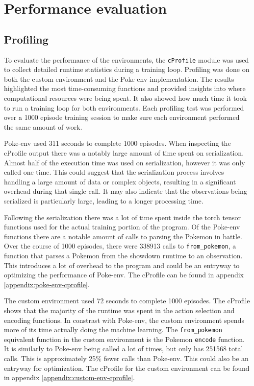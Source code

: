 \section{Performance evaluation}
\label{sec:performance-evaluation}

\subsection{Profiling}
\label{sec:profiling}
To evaluate the performance of the environments, the \lstinline|cProfile| module was used to collect detailed runtime statistics during a training loop. 
Profiling was done on both the custom environment and the Poke-env implementation. The results highlighted the most time-consuming functions and provided 
insights into where computational resources were being spent. It also showed how much time it took to run a training loop for both environments.
Each profiling test was performed over a 1000 episode training session to make sure each environment performed the same amount of work.

Poke-env used 311 seconds to complete 1000 episodes. When inspecting the cProfile output there was a notably large amount of time spent on serialization.
Almost half of the execution time was used on serialization, however it was only called one time. This could suggest that the serialization process involves 
handling a large amount of data or complex objects, resulting in a significant overhead during that single call. It may also indicate that the 
observations being serialized is particularly large, leading to a longer processing time. 

Following the serialization there was a lot of time spent inside the torch tensor functions used for the actual training portion of the program. Of the Poke-env
functions there are a notable amount of calls to parsing the Pokemon in battle. Over the course of 1000 episodes, there were 338913 calls to \lstinline|from_pokemon|, 
a function that parses a Pokemon from the showdown runtime to an observation. This introduces a lot of overhead to the program and could be an entryway
to optimizing the performance of Poke-env. The cProfile can be found in appendix \ref{appendix:poke-env-cprofile}.

The custom environment used 72 seconds to complete 1000 episodes. The cProfile shows that the majority of the runtime was spent in the 
action selection and encoding functions. In constrast with Poke-env, the custom environment spends more of its time actually doing the machine learning.
The \lstinline|from_pokemon| equivalent function in the custom environment is the Pokemon \lstinline|encode| function. It is similarly to Poke-env being
called a lot of times, but only has 251568 total calls. This is approximately 25\% fewer calls than Poke-env. This could also be an entryway for optimization.
The cProfile for the custom environment can be found in appendix \ref{appendix:custom-env-cprofile}. 


